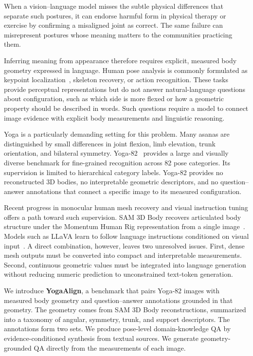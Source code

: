 \documentclass[conference]{IEEEtran}
\begin{document}
When a vision--language model misses the subtle physical differences that separate such postures, it can endorse harmful form in physical therapy or exercise by confirming a misaligned joint as correct.
The same failure can misrepresent postures whose meaning matters to the communities practicing them.

Inferring meaning from appearance therefore requires explicit, measured body geometry expressed in language.
Human pose analysis is commonly formulated as keypoint localization~\cite{cao2019openpose,sun2019deep}, skeleton recovery, or action recognition.
These tasks provide perceptual representations but do not answer natural-language questions about configuration, such as which side is more flexed or how a geometric property should be described in words.
Such questions require a model to connect image evidence with explicit body measurements and linguistic reasoning.

Yoga is a particularly demanding setting for this problem.
Many asanas are distinguished by small differences in joint flexion, limb elevation, trunk orientation, and bilateral symmetry.
Yoga-82~\cite{verma2020yoga82} provides a large and visually diverse benchmark for fine-grained recognition across 82 pose categories.
Its supervision is limited to hierarchical category labels.
Yoga-82 provides no reconstructed 3D bodies, no interpretable geometric descriptors, and no question--answer annotations that connect a specific image to its measured configuration.

Recent progress in monocular human mesh recovery and visual instruction tuning offers a path toward such supervision.
SAM 3D Body recovers articulated body structure under the Momentum Human Rig representation from a single image~\cite{yang2026sam3dbody}.
Models such as LLaVA learn to follow language instructions conditioned on visual input~\cite{liu2023visual}.
A direct combination, however, leaves two unresolved issues.
First, dense mesh outputs must be converted into compact and interpretable measurements.
Second, continuous geometric values must be integrated into language generation without reducing numeric prediction to unconstrained text-token generation.

We introduce \textbf{YogaAlign}, a benchmark that pairs Yoga-82 images with measured body geometry and question--answer annotations grounded in that geometry.
The geometry comes from SAM 3D Body reconstructions, summarized into a taxonomy of angular, symmetry, trunk, and support descriptors.
The annotations form two sets.
We produce pose-level domain-knowledge QA by evidence-conditioned synthesis from textual sources.
We generate geometry-grounded QA directly from the measurements of each image.
\end{document}

